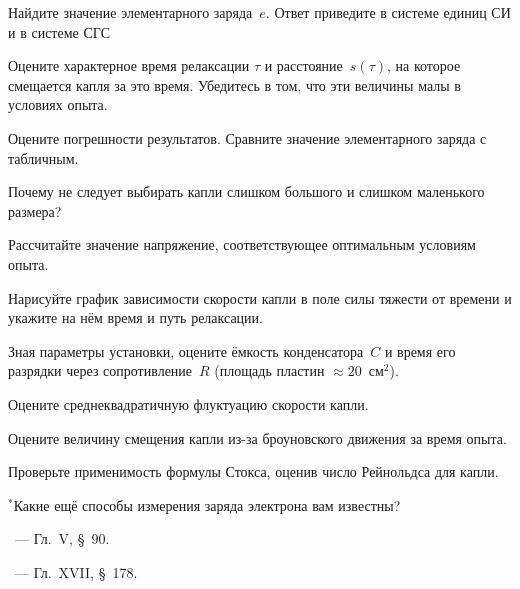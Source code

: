 \begin{lab:task}
\item Найдите значение элементарного заряда~$e$. 
Ответ приведите в системе единиц СИ и в системе СГС

\item Оцените характерное время релаксации $\tau$ и расстояние~$s(\tau)$, 
на которое смещается капля за это время. Убедитесь в том, что эти величины
малы в условиях опыта.

\item Оцените погрешности результатов. Сравните значение элементарного заряда
с табличным.

\end{lab:task}


\begin{lab:questions}
\item Почему не следует выбирать капли слишком большого и слишком маленького
размера?

\item Рассчитайте значение напряжение, соответствующее оптимальным условиям опыта.

\item Нарисуйте график зависимости скорости капли в поле силы тяжести от времени
и укажите на нём время и путь релаксации.

\item Зная параметры установки, оцените ёмкость конденсатора~$C$ и время его
разрядки через сопротивление~$R$ (площадь пластин $\approx 20$~см$^2$).

\item Оцените среднеквадратичную флуктуацию скорости капли.

\item Оцените величину смещения капли из-за броуновского движения за время опыта.

\item Проверьте применимость формулы Стокса, оценив число Рейнольдса для капли.

\item $^*$Какие ещё способы измерения заряда электрона вам известны?
\end{lab:questions}


\begin{lab:literature}
\item \SivuhinIII~--- Гл.~V, \S~90.
\item \Kalashnikov~--- Гл.~XVII, \S~178.
\end{lab:literature}
